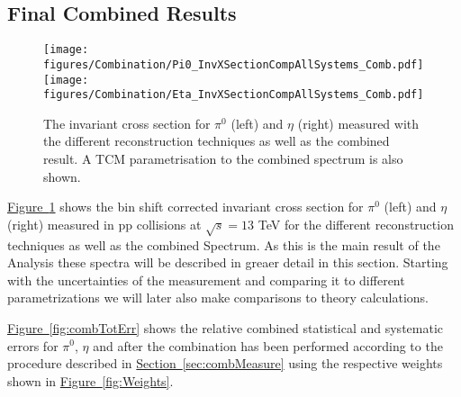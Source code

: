 \subsection{Final Combined Results}
\label{sec:combResults}

		\begin{figure}[h]
	 		\centering
	 			\texttt{[image: figures/Combination/Pi0\_InvXSectionCompAllSystems\_Comb.pdf]}
	 			\texttt{[image: figures/Combination/Eta\_InvXSectionCompAllSystems\_Comb.pdf]}
	 			\caption{The invariant cross section for $\pi^0$ (left) and $\eta$ (right) measured with the different reconstruction techniques as well as the combined result. A TCM parametrisation to the combined spectrum is also shown.}
	 			\label{fig:CombSpectrumAndIndividual}
	 		\end{figure}

\hyperref[fig:CombSpectrumAndIndividual]{Figure~\ref*{fig:CombSpectrumAndIndividual}} shows the bin shift corrected invariant cross section for $\pi^0$ (left) and $\eta$ (right) measured in pp collisions at $\sqrt{s} = 13$ TeV for the different reconstruction techniques as well as the combined Spectrum. As this is the main result of the Analysis these spectra will be described in greaer detail in this section. Starting with the uncertainties of the measurement and comparing it to different parametrizations we will later also make comparisons to theory calculations.

 \hyperref[fig:combTotErr]{Figure~\ref*{fig:combTotErr}} shows the relative combined statistical and systematic errors for $\pi^0$, $\eta$ and \EtaToPi after the combination has been performed according to the procedure described in \hyperref[sec:combMeasure]{Section~\ref*{sec:combMeasure}} using the respective weights shown in \hyperref[fig:Weights]{Figure~\ref*{fig:Weights}}.

